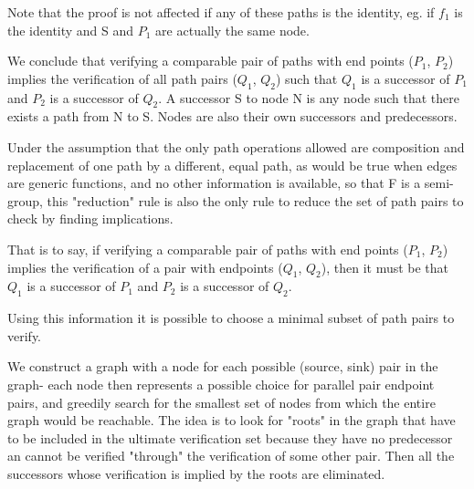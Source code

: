 \documentclass[sigplan,review,anonymous]{acmart}
\begin{document}
Note that the proof is not affected if any of these paths is the identity, eg. if $f_1$ is the identity and S and $P_1$ are actually the same node.

We conclude that verifying a comparable pair of paths with end points ($P_1$, $P_2$) implies the verification of all path pairs ($Q_1$, $Q_2$) such that $Q_1$ is a successor of $P_1$ and $P_2$ is a successor of $Q_2$. A successor S to node N is any node such that there exists a path from N to S. Nodes are also their own successors and predecessors.

Under the assumption that the only path operations allowed are composition and replacement of one path by a different, equal path, as would be true when edges are generic functions, and no other information is available, so that F is a semi-group, this "reduction" rule is also the only rule to reduce the set of path pairs to check by finding implications.

That is to say, if verifying a comparable pair of paths with end points ($P_1$, $P_2$) implies the verification of a pair with endpoints ($Q_1$, $Q_2$), then it must be that $Q_1$ is a successor of $P_1$ and $P_2$ is a successor of $Q_2$. %

Using this information it is possible to choose a minimal subset of path pairs to verify.

We construct a graph with a node for each possible (source, sink) pair in the graph- each node then represents a possible choice for parallel pair endpoint pairs, and greedily search for the smallest set of nodes from which the entire graph would be reachable. The idea is to look for "roots" in the graph that have to be included in the ultimate verification set because they have no predecessor an cannot be verified "through" the verification of some other pair. Then all the successors whose verification is implied by the roots are eliminated.
\end{document}
